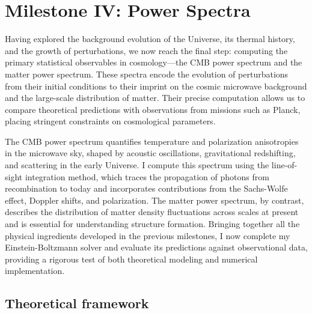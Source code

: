 \documentclass{aa}
\numberwithin{equation}{section}
\numberwithin{table}{section}
\numberwithin{figure}{section}
\begin{document}
\section{Milestone IV: Power Spectra}\label{sec: milestone IV}
Having explored the background evolution of the Universe, its thermal history, and the growth of perturbations, we now reach the final step: computing the primary statistical observables in cosmology—the CMB power spectrum and the matter power spectrum. These spectra encode the evolution of perturbations from their initial conditions to their imprint on the cosmic microwave background and the large-scale distribution of matter. Their precise computation allows us to compare theoretical predictions with observations from missions such as Planck, placing stringent constraints on cosmological parameters.  

The CMB power spectrum quantifies temperature and polarization anisotropies in the microwave sky, shaped by acoustic oscillations, gravitational redshifting, and scattering in the early Universe. I compute this spectrum using the line-of-sight integration method, which traces the propagation of photons from recombination to today and incorporates contributions from the Sachs-Wolfe effect, Doppler shifts, and polarization. The matter power spectrum, by contrast, describes the distribution of matter density fluctuations across scales at present and is essential for understanding structure formation. Bringing together all the physical ingredients developed in the previous milestones, I now complete my Einstein-Boltzmann solver and evaluate its predictions against observational data, providing a rigorous test of both theoretical modeling and numerical implementation.





\subsection{Theoretical framework}\label{subsec: IV theory}
\end{document}
